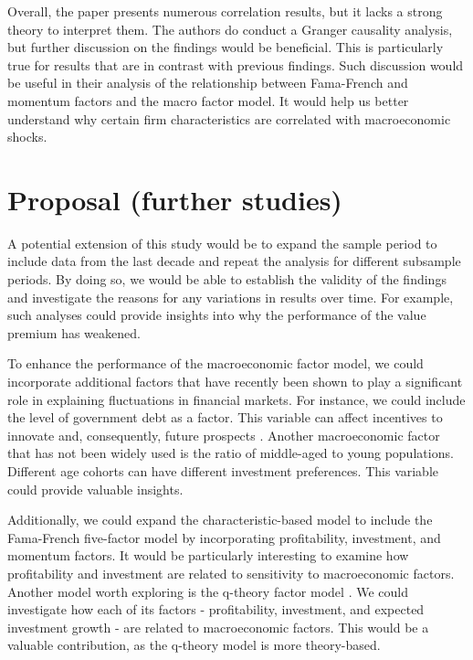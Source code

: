 \documentclass[12pt,a4paper]{ouparticle}
\begin{document}
Overall, the paper presents numerous correlation results, but it lacks a strong theory to interpret them. The authors do conduct a Granger causality analysis, but further discussion on the findings would be beneficial. This is particularly true for results that are in contrast with previous findings. Such discussion would be useful in their analysis of the relationship between Fama-French and momentum factors and the macro factor model. It would help us better understand why certain firm characteristics are correlated with macroeconomic shocks.



\section{Proposal (further studies)}
A potential extension of this study would be to expand the sample period to include data from the last decade and repeat the analysis for different subsample periods. By doing so, we would be able to establish the validity of  the findings and investigate the reasons for any variations in results over time. For example, such analyses could provide insights into why the performance of the value premium has weakened. 
 
To enhance the performance of the macroeconomic factor model, we could incorporate additional factors that have recently been shown to play a significant role in explaining fluctuations in financial markets. For instance, we could include the level of government debt as a factor. This variable can affect incentives to innovate and, consequently, future prospects \citep{croce2019government}. Another macroeconomic factor that has not been widely used is the ratio of middle-aged to young populations. Different age cohorts can have different investment preferences. This variable could provide valuable insights.

Additionally, we could expand the characteristic-based model to include the Fama-French five-factor model \citep{fama2015five} by incorporating profitability, investment, and momentum factors. It would be particularly interesting to examine how profitability and investment are related to sensitivity to macroeconomic factors. Another model worth exploring is the q-theory factor model \citep{hou2015digesting,hou2021augmented}. We could investigate how each of its factors - profitability, investment, and expected investment growth - are related to macroeconomic factors. This would be a valuable contribution, as the q-theory model is more theory-based. 
\end{document}
